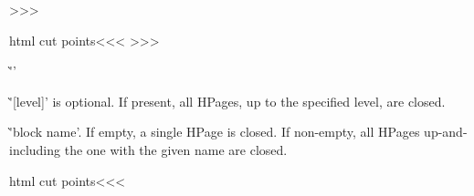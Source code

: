{{\def\op:bbft#1[#2]{%
   \:hookI{BeforeHPageButton}{}{}%
   \edef\:temp{#2}%
   \ifx \:temp\empty \:warning{\string\HPageButton-[]?}\fi
   \TagFile{|<fr bt fl|>\:temp}%
   \edef\HP:file{\RefFile\:temp}%
   \HP:Link%
   \def\ContHPage{\EndLink
      \:hookI{AfterHPageButton}{}{}%
      \csname AfterHPage\endcsname  }}
>>>


\<html cut points\><<<
\def\BeginHPage{\futurelet\:temp\ch:bbbt}
\def\ch:bbbt{%
   |<entring file of hpage|>%
   \NewFileName\HP:file   \Save:Link\HP:file 
   \ifx -\:temp  \expandafter\op:bbbt
   \else         \expandafter\:bbbt   \fi}
\def\:bbbt[#1]#2{%
   \PushStack\:btid{#1}%
   \:btfile{#2}%
   \:buttrc\BeginHPage{[#1]{#2}}%
   \PushStack\:afterbt\empty 
   \hpg:wrn{#1}{#2}\BeginHPage    \Save:HPageTag\:temp
   \Save:HPage{#2}%
   \TagFile{\:temp}}
\def\op:bbbt#1[#2]{%
   \PushStack\:btid{#2}%
   \:hookI{AfterHPageButton}{}{}%
   \:btfile{}%
   \:buttrc\BeginHPage{[#2]}%
   \PushStack\:afterbt\empty    \edef\:temp{#2}%
   \ifx \:temp\empty \:warning{\string\BeginHPage-[]?}\fi
   \Save:HPageTag\:temp   \Save:HPage{}%
   \TagFile{\:temp}}
>>>






\`''

\List{$\bullet$}

\item \`'[level]' is optional. If present, all HPages, up to the
specified level, are closed.

\item \`'block name'. If empty, a single HPage is closed. If
non-empty, all HPages up-and-including the one with the given name
are closed.

\EndList

\<html cut points\><<<
\def\EndHPage{\futurelet\:temp\chEnd:HPage}
\def\chEnd:HPage{\ifx  [\:temp  \expandafter\opEnd:HPage
              \else          \expandafter\End:HPage   \fi}
\def\opEnd:HPage[#1]{%
   \ifnum  #1>\HPageDepth\space
      \:warning{\string\EndHPage[#1]?}%
      \let\:temp|=\:gobble 
   \else \ifnum  #1<\HPageDepth\space
      \def\:temp{\:EndHPage\EndHPage[#1]{}}%
   \else \let\:temp|=\End:HPage \fi \fi
   \:temp }

\def\End:HPage#1{%
   \ifnum \HPageDepth<1 \:warning{\string\EndHPage{#1}?}\let\:temp|=\:gobble
   \else  \ifinner\else\:clearpage\fi   \PopStack\:btid\:tempa
      \def\:tempb{#1}\ifx  \:tempb\empty\let\:temp|=\:EndHPage
      \else  \ifx  \:tempb\:tempa       \let\:temp|=\:EndHPage
      \else  \Recall:HPageTag\:tempa
             \Save:HPageTag\:tempa
             \ifx  \:tempb\:tempa       \let\:temp|=\:EndHPage
      \else                    \def\:temp{\:EndHPage\End:HPage{#1}}%
   \fi\fi\fi\fi
   \:temp }

}}

